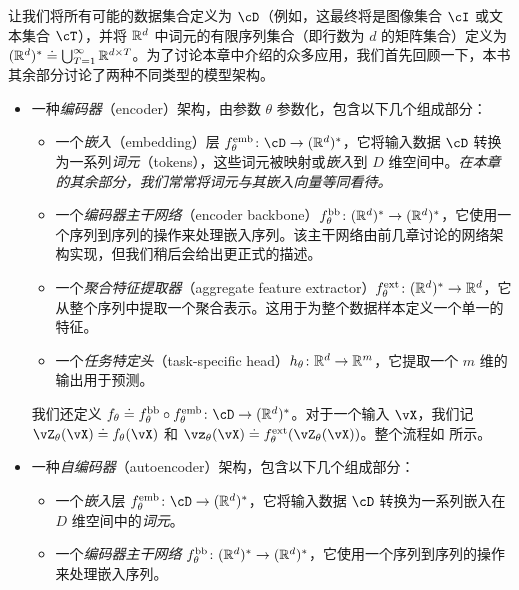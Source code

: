 \documentclass[../../book-main_zh.tex]{subfiles}
\begin{document}
让我们将所有可能的数据集合定义为 \(\cD\)（例如，这最终将是图像集合 \(\cI\) 或文本集合 \(\cT\)），并将 \(\mathbb{R}^{d}\) 中词元的有限序列集合（即行数为 \(d\) 的矩阵集合）定义为 \((\mathbb{R}^{d})^{*} \doteq \bigcup_{T = 1}^{\infty}\mathbb{R}^{d \times T}\)。为了讨论本章中介绍的众多应用，我们首先回顾一下，本书其余部分讨论了两种不同类型的模型架构。
\begin{itemize}
    \item 一种\textit{编码器}（encoder）架构，由参数 \(\theta\) 参数化，包含以下几个组成部分：
    \begin{itemize}
        \item 一个\textit{嵌入}（embedding）层 \(f_{\theta}^{\emb} \colon \cD \to (\R^{d})^{*}\)，它将输入数据 \(\cD\) 转换为一系列\textit{词元}（tokens），这些词元被映射或\textit{嵌入}到 \(D\) 维空间中。\textit{在本章的其余部分，我们常常将词元与其嵌入向量等同看待。}
        \item 一个\textit{编码器主干网络}（encoder backbone）\(f_{\theta}^{\mathrm{bb}} \colon (\mathbb{R}^{d})^{*} \to (\mathbb{R}^{d})^{*}\)，它使用一个序列到序列的操作来处理嵌入序列。该主干网络由前几章讨论的网络架构实现，但我们稍后会给出更正式的描述。
        \item 一个\textit{聚合特征提取器}（aggregate feature extractor）\(f_{\theta}^{\mathrm{ext}} \colon (\mathbb{R}^{d})^{*} \to \mathbb{R}^{d}\)，它从整个序列中提取一个聚合表示。这用于为整个数据样本定义一个单一的特征。
        \item 一个\textit{任务特定头}（task-specific head）\(h_{\theta} \colon \mathbb{R}^{d} \to \mathbb{R}^{m}\)，它提取一个 \(m\) 维的输出用于预测。
    \end{itemize}
    我们还定义 \(f_{\theta} \doteq f_{\theta}^{\backbone} \circ f_{\theta}^{\emb} \colon \cD \to (\R^{d})^{*}\)。对于一个输入 \(\vX\)，我们记 \(\vZ_{\theta}(\vX) \doteq f_{\theta}(\vX)\) 和 \(\vz_{\theta}(\vX) \doteq f_{\theta}^{\ext}(\vZ_{\theta}(\vX))\)。整个流程如  所示。
    \item 一种\textit{自编码器}（autoencoder）架构，包含以下几个组成部分：
    \begin{itemize}
        \item 一个\textit{嵌入}层 \(f_{\theta}^{\emb} \colon \cD \to (\R^{d})^{*}\)，它将输入数据 \(\cD\) 转换为一系列嵌入在 \(D\) 维空间中的\textit{词元}。
        \item 一个\textit{编码器主干网络} \(f_{\theta}^{\mathrm{bb}} \colon (\mathbb{R}^{d})^{*} \to (\mathbb{R}^{d})^{*}\)，它使用一个序列到序列的操作来处理嵌入序列。

\end{itemize}
\end{itemize}
\end{document}
